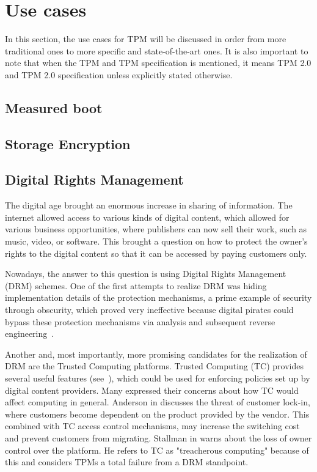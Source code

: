 \section{Use cases}
In this section, the use cases for TPM will be discussed in order from more traditional ones to more specific and state-of-the-art ones. It is also important to note that when the TPM and TPM specification is mentioned, it means TPM 2.0 and TPM 2.0 specification unless explicitly stated otherwise.

\subsection{Measured boot}


\subsection{Storage Encryption}

\subsection{Digital Rights Management}
The digital age brought an enormous increase in sharing of information. The internet allowed access to various kinds of digital content, which allowed for various business opportunities, where publishers can now sell their work, such as music, video, or software. This brought a question on how to protect the owner's rights to the digital content so that it can be accessed by paying customers only.

Nowadays, the answer to this question is using Digital Rights Management (DRM) schemes. One of the first attempts to realize DRM was hiding implementation details of the protection mechanisms, a prime example of security through obscurity, which proved very ineffective because digital pirates could bypass these protection mechanisms via analysis and subsequent reverse engineering~\cite{schmidthardware}.

Another and, most importantly, more promising candidates for the realization of DRM are the Trusted Computing platforms. Trusted Computing (TC) provides several useful features (see~), which could be used for enforcing policies set up by digital content providers. Many expressed their concerns about how TC would affect computing in general. Anderson in \cite{anderson2003cryptography} discusses the threat of customer lock-in, where customers become dependent on the product provided by the vendor. This combined with TC access control mechanisms, may increase the switching cost and prevent customers from migrating. Stallman in \cite{stallman2002treacherous} warns about the loss of owner control over the platform. He refers to TC as "treacherous computing" because of this and considers TPMs a total failure from a DRM standpoint. 

